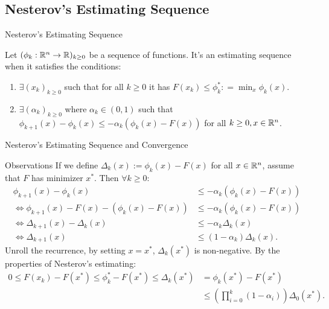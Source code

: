 \documentclass[11pt]{beamer}
\begin{document}
    \subsection{Nesterov's Estimating Sequence}
        \begin{frame}{Nesterov's Estimating Sequence}            
            \begin{definition}\label{def:nes-est-seq}
                Let $(\phi_k : \mathbb R^n \rightarrow \mathbb R)_{k \ge 0}$ be a sequence of functions. 
                It's an estimating sequence when it satisfies the conditions: 
                \begin{enumerate}
                    \item $\exists (x_k)_{k \ge 0}$ such that for all $k \ge 0$ it has $F(x_k) \le \phi_k^*: =\min_{x}\phi_k(x)$. 
                    \item $\exists (\alpha_k)_{k \ge 0}$ where $\alpha_k \in (0, 1)$ such that $\phi_{k + 1}(x) - \phi_k(x) \le - \alpha_k(\phi_k(x) - F(x))$ for all $k\ge 0, x \in \mathbb R^n$.
                \end{enumerate}
            \end{definition}
        \end{frame}

        \begin{frame}{Nesterov's Estimating Sequence and Convergence}
            \begin{block}{Observations}
                {\small
                If we define $\Delta_k(x) := \phi_k (x) - F(x)$ for all $x \in \mathbb R^n$, assume that $F$ has minimizer $x^*$. 
                Then $\forall k \ge 0$:  
                \begin{align*}
                    \phi_{k + 1}(x) - \phi_k(x) 
                    &\le - \alpha_k (\phi_k(x) - F(x))
                    \\
                    \iff 
                    \phi_{k + 1}(x) - F(x) - (\phi_k(x) - F(x))
                    &\le 
                    -\alpha_k(\phi_k(x) - F(x))
                    \\
                    \iff
                    \Delta_{k + 1}(x) - \Delta_k(x) &\le
                    - \alpha_k\Delta_k(x)
                    \\
                    \iff 
                    \Delta_{k + 1}(x) 
                    &\le 
                    (1 - \alpha_k)\Delta_k(x). 
                \end{align*}
                Unroll the recurrence, by setting $x = x^*$, $\Delta_k(x^*)$ is non-negative. By the properties of Nesterov's estimating: 
                \begin{align*}
                    0\le F(x_k) - F(x^*) \le \phi_k^* - F(x^*) \le \Delta_k(x^*) 
                    &= \phi_k(x^*) - F(x^*) 
                    \\
                    &\le \left(\prod_{i = 0}^k(1 - \alpha_i)\right)\Delta_0(x^*).
                \end{align*}
                }
            \end{block}
        \end{frame}
\end{document}

